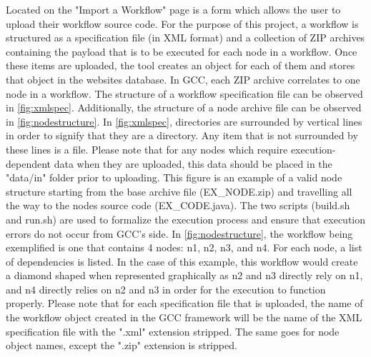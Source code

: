 \documentclass[fleqn,10pt]{SelfArx} %
\begin{document}
Located on the "Import a Workflow" page is a form which allows the user to upload their workflow source code. For the purpose of this project, a workflow is structured as a specification file (in XML format) and a collection of ZIP archives containing the payload that is to be executed for each node in a workflow. Once these items are uploaded, the tool creates an object for each of them and stores that object in the websites database. In GCC, each ZIP archive correlates to one node in a workflow. The structure of a workflow specification file can be observed in \ref{fig:xmlspec}. Additionally, the structure of a node archive file can be observed in \ref{fig:nodestructure}. In \ref{fig:xmlspec}, directories are surrounded by vertical lines in order to signify that they are a directory. Any item that is not surrounded by these lines is a file. Please note that for any nodes which require execution-dependent data when they are uploaded, this data should be placed in the "data/in" folder prior to uploading. This figure is an example of a valid node structure starting from the base archive file (EX\_NODE.zip) and travelling all the way to the nodes source code (EX\_CODE.java). The two scripts (build.sh and run.sh) are used to formalize the execution process and ensure that execution errors do not occur from GCC’s side. In \ref{fig:nodestructure}, the workflow being exemplified is one that contains 4 nodes: n1, n2, n3, and n4. For each node, a list of dependencies is listed. In the case of this example, this workflow would create a diamond shaped when represented graphically as n2 and n3 directly rely on n1, and n4 directly relies on n2 and n3 in order for the execution to function properly. Please note that for each specification file that is uploaded, the name of the workflow object created in the GCC framework will be the name of the XML specification file with the ".xml" extension stripped. The same goes for node object names, except the ".zip" extension is stripped.
\end{document}
